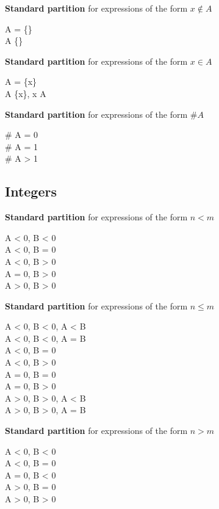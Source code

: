 \noindent\textbf{Standard partition} for expressions of the form $x \notin A$
\begin{zed}
A = \{\} \\
A \neq \{\}
\end{zed}

\noindent\textbf{Standard partition} for expressions of the form $x \in A$
\begin{zed}
A = \{x\} \\
A \neq \{x\}, x \in A
\end{zed}

\noindent\textbf{Standard partition} for expressions of the form $\# A$
\begin{zed}
\# A = 0 \\
\# A = 1 \\
\# A > 1
\end{zed}


\subsection{Integers}

\noindent\textbf{Standard partition} for expressions of the form $n < m$
\begin{zed}
A < 0, B < 0\\
A < 0, B = 0\\
A < 0, B > 0\\
A = 0, B > 0\\
A > 0, B > 0
\end{zed}


\noindent\textbf{Standard partition} for expressions of the form $n \leq m$
\begin{zed}
A < 0, B < 0, A < B\\
A < 0, B < 0, A = B\\
A < 0, B = 0\\
A < 0, B > 0\\
A = 0, B = 0\\
A = 0, B > 0\\
A > 0, B > 0, A < B\\
A > 0, B > 0, A = B
\end{zed}

\noindent\textbf{Standard partition} for expressions of the form $n > m$
\begin{zed}
A < 0, B < 0\\
A < 0, B = 0\\
A = 0, B < 0\\
A > 0, B = 0\\
A > 0, B > 0
\end{zed}

